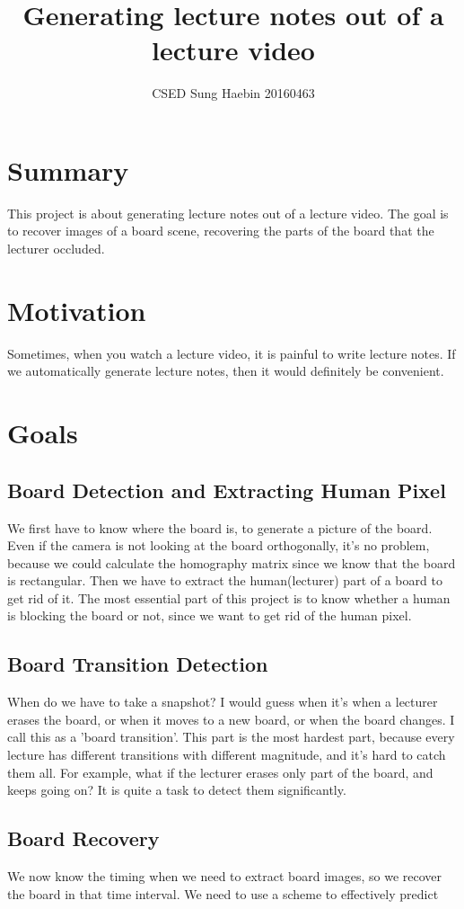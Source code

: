 \documentclass[a4paper]{article}
\title{Generating lecture notes out of a lecture video}
\author{CSED Sung Haebin 20160463}
\begin{document}
\maketitle
\section{Summary}
This project is about generating lecture notes out of a lecture video.
The goal is to recover images of a board scene, recovering the parts of the board that the lecturer occluded.

\section{Motivation}
Sometimes, when you watch a lecture video, it is painful to write lecture notes. 
If we automatically generate lecture notes, then it would definitely be convenient.

\section{Goals}
\subsection{Board Detection and Extracting Human Pixel}
We first have to know where the board is, to generate a picture of the board. Even if the camera is not looking at the board orthogonally, it's no problem, because we could calculate the homography matrix since we know that the board is rectangular. Then we have to extract the human(lecturer) part of a board to get rid of it. The most essential part of this project is to know whether a human is blocking the board or not, since we want to get rid of the human pixel.
\subsection{Board Transition Detection}
When do we have to take a snapshot? I would guess when it's when a lecturer erases the board, or when it moves to a new board, or when the board changes. I call this as a 'board transition'. This part is the most hardest part, because every lecture has different transitions with different magnitude, and it's hard to catch them all. For example, what if the lecturer erases only part of the board, and keeps going on? It is quite a task to detect them significantly.
\subsection{Board Recovery}
We now know the timing when we need to extract board images, so we recover the board in that time interval. We need to use a scheme to effectively predict 
\end{document}
